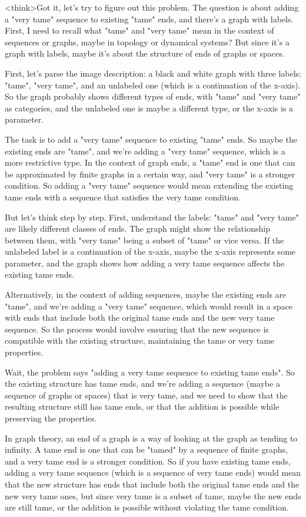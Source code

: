 <think>Got it, let's try to figure out this problem. The question is about adding a "very tame" sequence to existing "tame" ends, and there's a graph with labels. First, I need to recall what "tame" and "very tame" mean in the context of sequences or graphs, maybe in topology or dynamical systems? But since it's a graph with labels, maybe it's about the structure of ends of graphs or spaces.

First, let's parse the image description: a black and white graph with three labels: "tame", "very tame", and an unlabeled one (which is a continuation of the x-axis). So the graph probably shows different types of ends, with "tame" and "very tame" as categories, and the unlabeled one is maybe a different type, or the x-axis is a parameter.

The task is to add a "very tame" sequence to existing "tame" ends. So maybe the existing ends are "tame", and we're adding a "very tame" sequence, which is a more restrictive type. In the context of graph ends, a "tame" end is one that can be approximated by finite graphs in a certain way, and "very tame" is a stronger condition. So adding a "very tame" sequence would mean extending the existing tame ends with a sequence that satisfies the very tame condition.

But let's think step by step. First, understand the labels: "tame" and "very tame" are likely different classes of ends. The graph might show the relationship between them, with "very tame" being a subset of "tame" or vice versa. If the unlabeled label is a continuation of the x-axis, maybe the x-axis represents some parameter, and the graph shows how adding a very tame sequence affects the existing tame ends.

Alternatively, in the context of adding sequences, maybe the existing ends are "tame", and we're adding a "very tame" sequence, which would result in a space with ends that include both the original tame ends and the new very tame sequence. So the process would involve ensuring that the new sequence is compatible with the existing structure, maintaining the tame or very tame properties.

Wait, the problem says "adding a very tame sequence to existing tame ends". So the existing structure has tame ends, and we're adding a sequence (maybe a sequence of graphs or spaces) that is very tame, and we need to show that the resulting structure still has tame ends, or that the addition is possible while preserving the properties.

In graph theory, an end of a graph is a way of looking at the graph as tending to infinity. A tame end is one that can be "tamed" by a sequence of finite graphs, and a very tame end is a stronger condition. So if you have existing tame ends, adding a very tame sequence (which is a sequence of very tame ends) would mean that the new structure has ends that include both the original tame ends and the new very tame ones, but since very tame is a subset of tame, maybe the new ends are still tame, or the addition is possible without violating the tame condition.

